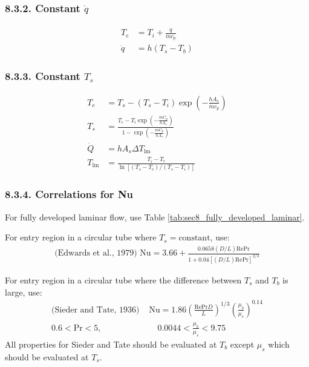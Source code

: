 \begin{multicols*}{2}
\subsubsection*{8.3.2. Constant $\dot{q}$}
\begin{align*}
    T_e &= T_i + \frac{\dot{q}}{\dot{m} c_p} \\ 
    \dot{q} &= h(T_s-T_b)
\end{align*}
\subsubsection*{8.3.3. Constant $T_s$}
\begin{align*}
    T_e &= T_s - (T_s - T_i) \exp\left(-\frac{h A_s}{\dot{m} c_p}\right) \\
    T_s &=\frac{T_e - T_i \exp\left(-\frac{\dot{m} C_p}{h A_s}\right)}{1 - \exp\left(-\frac{\dot{m} C_p}{h A_s}\right)} \\
    \dot{Q} &= h A_s \Delta T_{\text{lm}} \\
    T_{\text{lm}} &= \frac{T_{i} - T_{e}}{\ln[(T_{s} - T_{e})/(T_{s} - T_{i})]} 
\end{align*}    
\subsubsection*{8.3.4. Correlations for Nu}
For fully developed laminar flow, use Table \ref{tab:sec8_fully_developed_laminar}.

For entry region in a circular tube where $T_s = \text{constant}$, use:
\begin{align*}
    \text{(Edwards et al., 1979) } \text{Nu} = 3.66 + \frac{0.0658(D/L) \text{Re} \text{Pr}}{1 + 0.04[(D/L) \text{Re} \text{Pr}]^{2/3}} 
\end{align*}

For entry region in a circular tube where the difference between $T_s$ and $T_b$ is large, use:
\begin{align*}
    \text{(Sieder and Tate, 1936) } &\text{Nu} = 1.86\left(\frac{\text{Re} \text{Pr} D}{L}\right)^{1/3} \left(\frac{\mu_b}{\mu_s}\right)^{0.14} \\
    0.6 < \text{Pr} < 5, &\quad 0.0044 < \frac{\mu_b}{\mu_s} < 9.75
\end{align*}
All properties for Sieder and Tate should be evaluated at $T_b$ except $\mu_s$ which should be evaluated at $T_s$.


\end{multicols*}
